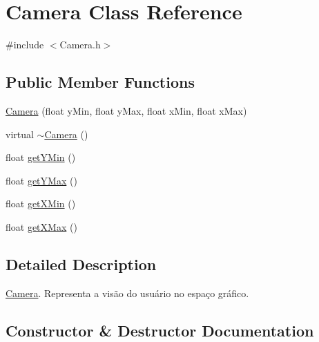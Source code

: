 \hypertarget{class_camera}{}\section{Camera Class Reference}
\label{class_camera}


{\ttfamily \#include $<$Camera.\+h$>$}

\subsection*{Public Member Functions}
\begin{DoxyCompactItemize}
\item 
\hyperlink{class_camera_ad5ec4b2d8dcb89942be578e118f2eba2}{Camera} (float y\+Min, float y\+Max, float x\+Min, float x\+Max)
\item 
virtual \hyperlink{class_camera_ac9ed2a1433c5afdfb9cdf5b282fbc350}{$\sim$\+Camera} ()
\item 
float \hyperlink{class_camera_a9ed7605181fc8b2e651752df3694ec57}{get\+Y\+Min} ()
\item 
float \hyperlink{class_camera_af58913a23ab86c6ff3304163db397f04}{get\+Y\+Max} ()
\item 
float \hyperlink{class_camera_a570171883e74e10ed4144235a14a9812}{get\+X\+Min} ()
\item 
float \hyperlink{class_camera_a6cd3412dd5d2d33a1fa9bfdd1cce3ae6}{get\+X\+Max} ()
\end{DoxyCompactItemize}


\subsection{Detailed Description}
\hyperlink{class_camera}{Camera}. Representa a visão do usuário no espaço gráfico. 

\subsection{Constructor \& Destructor Documentation}
\hypertarget{class_camera_ad5ec4b2d8dcb89942be578e118f2eba2}{}
